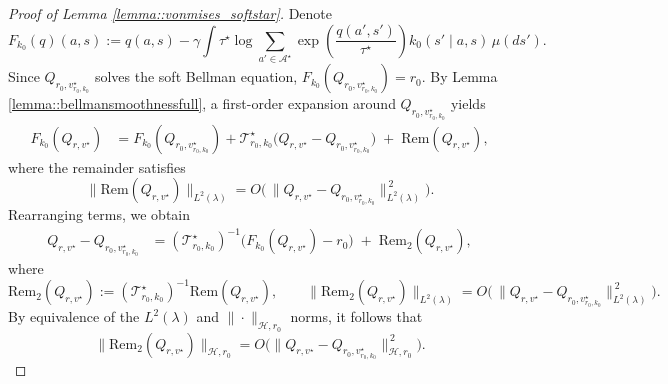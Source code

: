 \documentclass[11pt]{article}
\theoremstyle{plain}
\begin{document}
\begin{proof}[Proof of Lemma \ref{lemma::vonmises_softstar}]
Denote
\[
F_{k_0}(q)(a,s)
:= q(a,s) - \gamma \int \tau^\star \log \!\sum_{a' \in \mathcal{A}^\star}
      \exp\!\left(\frac{q(a',s')}{\tau^\star}\right)
      k_0(s' \mid a,s)\,\mu(ds').
\]
Since \(Q_{r_0,v_{r_0,k_0}^\star}\) solves the soft Bellman equation, \(F_{k_0}(Q_{r_0,v_{r_0,k_0}^\star})=r_0\).
By Lemma \ref{lemma::bellmansmoothnessfull}, a first-order expansion around \(Q_{r_0,v_{r_0,k_0}^\star}\) yields
\begin{align*}
F_{k_0}(Q_{r,v^\star})
&= F_{k_0}(Q_{r_0,v_{r_0,k_0}^\star})
  + \mathcal{T}_{r_0,k_0}^\star\!\bigl(Q_{r,v^\star} - Q_{r_0,v_{r_0,k_0}^\star}\bigr)
  \;+\; \mathrm{Rem}(Q_{r,v^\star}),
\end{align*}
where the remainder satisfies
\[
\bigl\|\mathrm{Rem}(Q_{r,v^\star})\bigr\|_{L^2(\lambda)}
= O\!\bigl(\,\|Q_{r,v^\star} - Q_{r_0,v_{r_0,k_0}^\star}\|_{L^2(\lambda)}^{\,2}\bigr).
\]
Rearranging terms, we obtain
\begin{align*}
Q_{r,v^\star} - Q_{r_0,v_{r_0,k_0}^\star}
&= (\mathcal{T}_{r_0,k_0}^\star)^{-1}\!\bigl(F_{k_0}(Q_{r,v^\star}) - r_0\bigr)
  \;+\; \mathrm{Rem}_2(Q_{r,v^\star}),
\end{align*}
where
\[
\mathrm{Rem}_2(Q_{r,v^\star})
:= (\mathcal{T}_{r_0,k_0}^\star)^{-1}\mathrm{Rem}(Q_{r,v^\star}),
\qquad
\bigl\|\mathrm{Rem}_2(Q_{r,v^\star})\bigr\|_{L^2(\lambda)}
= O\!\bigl(\,\|Q_{r,v^\star} - Q_{r_0,v_{r_0,k_0}^\star}\|_{L^2(\lambda)}^{\,2}\bigr).
\]
By equivalence of the \(L^2(\lambda)\) and \(\|\cdot\|_{\mathcal{H},r_0}\) norms, it follows that
\[
\bigl\|\mathrm{Rem}_2(Q_{r,v^\star})\bigr\|_{\mathcal{H},r_0}
= O\!\bigl(\|Q_{r,v^\star} - Q_{r_0,v_{r_0,k_0}^\star}\|_{\mathcal{H},r_0}^{\,2}\bigr).
\]



\end{proof}
\end{document}
